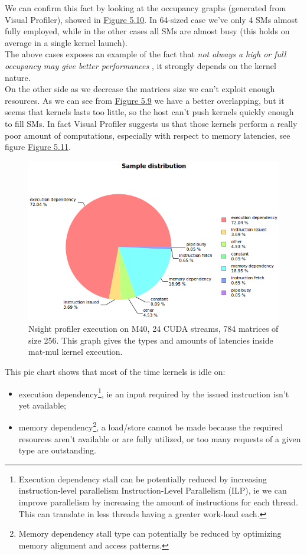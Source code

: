 We can confirm this fact by looking at the occupancy graphs (generated from Visual Profiler), showed in \hyperref[fig:SMuse]{Figure 5.10}. In 64-sized case we've only 4 SMs almost fully employed, while in the other cases all SMs are almost busy (this holds on average in a single kernel launch).\\
The above cases exposes an example of the fact that \textit{not always a high or full occupancy may give better performances} \cite{loweroccupancy,cudabestpractices}, it strongly depends on the kernel nature.\\
On the other side as we decrease the matrices size we can't exploit enough resources. As we can see from \hyperref[fig:timeln64]{Figure 5.9} we have a better overlapping, but it seems that kernels lasts too little, so the host can't push kernels quickly enough to fill SMs. In fact Visual Profiler suggests us that those kernels perform a really poor amount of computations, especially with respect to memory latencies, see figure \hyperref[fig:mat62latency]{Figure 5.11}.\\ 
\begin{figure}[!tb]
	\vspace{-1cm}
	\hspace{-1cm}
	\includegraphics[scale=0.8]{plots/matmul784_64_kerlatencies.png}
	\caption{Nsight profiler execution on M40, 24 CUDA streams, 784 matrices of size 256. This graph gives the types and amounts of latencies inside mat-mul kernel execution.}
	\label{fig:mat62latency}
\end{figure}
This pie chart shows that most of the time kernels is idle on:
\begin{itemize}
	\item execution dependency\footnote{Execution dependency stall can be potentially reduced by increasing instruction-level parallelism Instruction-Level Parallelism (ILP), ie we can improve parallelism by increasing the amount of instructions for each thread. This can translate in less threads having a greater work-load each.}, ie an input required by the issued instruction isn't yet available; 
	
	\item memory dependency\footnote{ Memory dependency stall type can potentially be reduced by optimizing memory alignment and access patterns.}, a load/store cannot be made because the required resources aren't available or are fully utilized, or too many requests of a given type are outstanding.
\end{itemize}
